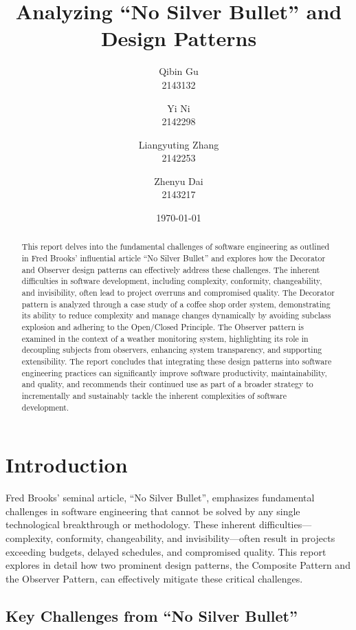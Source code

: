 \documentclass[11pt]{article}
\title{Analyzing ``No Silver Bullet'' and Design Patterns}
\author{Qibin Gu\\2143132 \and Yi Ni\\2142298 \and Liangyuting Zhang\\2142253 \and Zhenyu Dai\\2143217}
\date{\today}
\begin{document}

\maketitle
\begin{abstract}
This report delves into the fundamental challenges of software engineering as outlined in Fred Brooks' influential article ``No Silver Bullet'' and explores how the Decorator and Observer design patterns can effectively address these challenges. The inherent difficulties in software development, including complexity, conformity, changeability, and invisibility, often lead to project overruns and compromised quality. The Decorator pattern is analyzed through a case study of a coffee shop order system, demonstrating its ability to reduce complexity and manage changes dynamically by avoiding subclass explosion and adhering to the Open/Closed Principle. The Observer pattern is examined in the context of a weather monitoring system, highlighting its role in decoupling subjects from observers, enhancing system transparency, and supporting extensibility. The report concludes that integrating these design patterns into software engineering practices can significantly improve software productivity, maintainability, and quality, and recommends their continued use as part of a broader strategy to incrementally and sustainably tackle the inherent complexities of software development.
\end{abstract}

\newpage

\section{Introduction}
Fred Brooks' seminal article, ``No Silver Bullet'', emphasizes fundamental challenges in software engineering that cannot be solved by any single technological breakthrough or methodology. These inherent difficulties—complexity, conformity, changeability, and invisibility—often result in projects exceeding budgets, delayed schedules, and compromised quality. This report explores in detail how two prominent design patterns, the Composite Pattern and the Observer Pattern, can effectively mitigate these critical challenges.

\subsection{Key Challenges from ``No Silver Bullet''}
\end{document}
